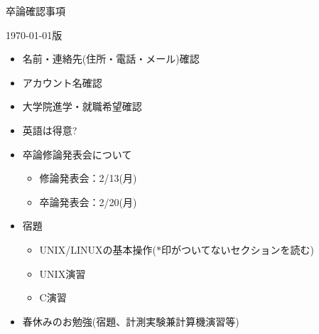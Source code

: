 \documentclass[11pt]{jarticle}
\begin{document}
\pagestyle{empty}
\begin{center}
  {\LARGE 卒論確認事項}
\end{center}
\begin{flushright}
{\today 版}
\end{flushright}

\begin{itemize}
\item 名前・連絡先(住所・電話・メール)確認
\item アカウント名確認
\item 大学院進学・就職希望確認
\item 英語は得意?
\item 卒論修論発表会について
  \begin{itemize}
  \item 修論発表会：2/13(月)
  \item 卒論発表会：2/20(月)
  \end{itemize}
\item 宿題
  \begin{itemize}
  \item UNIX/LINUXの基本操作($*$印がついてないセクションを読む)
  \item UNIX演習
  \item C演習
  \end{itemize}
\item 春休みのお勉強(宿題、計測実験兼計算機演習等)

\end{itemize}
\end{document}
